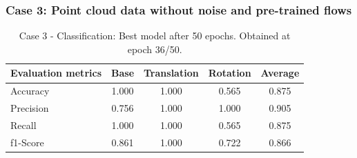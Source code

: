 \subsubsection{Case 3: Point cloud data without noise and pre-trained flows}
\begin{table}[H]
        \begin{center}
                \begin{tabular}{|l||c|c|c|c|}
                        \hline 
                        Evaluation metrics & Base & Translation & Rotation & Average \\
                        \hline \hline
                        Accuracy  & 1.000 & 1.000 &  0.565 &  0.875\\
                        \hline
                        Precision & 0.756 &  1.000 &  1.000 &  0.905\\
                        \hline
                        Recall & 1.000&  1.000& 0.565 & 0.875 \\
                        \hline
                        f1-Score &  0.861&  1.000 & 0.722 & 0.866 \\
                        \hline
                \end{tabular}
        \end{center}
        \caption{Case 3 - Classification: Best model after 50 epochs. Obtained at epoch 36/50.}
\end{table}
